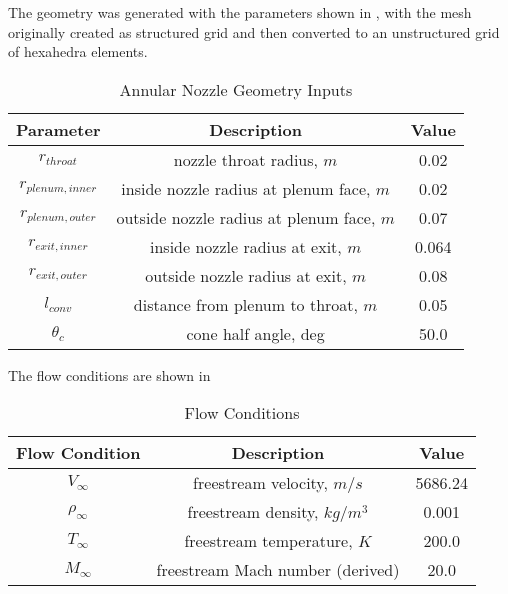 The geometry was generated with the parameters shown in ,
with the mesh originally created as structured grid and then converted to an
unstructured grid of hexahedra elements.
\begin{table}[h]
  \centering
  \begin{tabular}{c|c|c}
    Parameter & Description & Value \\
    \hline
    $r_{throat}$       &   nozzle throat radius, $m$                 & 0.02 \\
    $r_{plenum,inner}$ &   inside nozzle radius at plenum face, $m$  & 0.02 \\
    $r_{plenum,outer}$ &   outside nozzle radius at plenum face, $m$ & 0.07 \\
    $r_{exit,inner}$   &   inside nozzle radius at exit, $m$         & 0.064 \\
    $r_{exit,outer}$   &   outside nozzle radius at exit, $m$        & 0.08 \\
    $l_{conv}$         &   distance from plenum to throat, $m$       & 0.05 \\
    $\theta_c$         &   cone half angle, deg                      & 50.0
  \end{tabular}
  \caption{Annular Nozzle Geometry Inputs}
  \label{tab:annular-geom}
\end{table}
The flow conditions are shown in 
\begin{table}[!h]
  \centering
  \begin{tabular}{c|c|c}
    Flow Condition & Description & Value \\
    \hline
    $V_{\infty}$    & freestream velocity, $m/s$        & 5686.24 \\
    $\rho_{\infty}$ & freestream density, $kg/m^3$      & 0.001 \\
    $T_{\infty}$    & freestream temperature, $K$       & 200.0 \\
    $M_{\infty}$    & freestream Mach number (derived)  & 20.0
  \end{tabular}
  \caption{Flow Conditions}
  \label{tab:flow-conditions}
\end{table}

